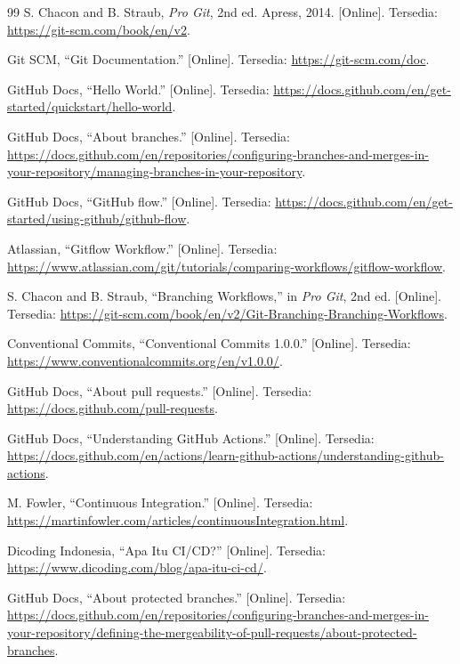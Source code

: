 \documentclass[a4paper,oneside,12pt]{report}
\renewcommand{\bibname}{Daftar Pustaka}
\begin{document}
\clearpage
{}
\renewcommand{\bibname}{Daftar Pustaka}
\begin{thebibliography}{99}
     S. Chacon and B. Straub, \textit{Pro Git}, 2nd ed. Apress, 2014. [Online]. Tersedia: \url{https://git-scm.com/book/en/v2}.

     Git SCM, ``Git Documentation.'' [Online]. Tersedia: \url{https://git-scm.com/doc}.

     GitHub Docs, ``Hello World.'' [Online]. Tersedia: \url{https://docs.github.com/en/get-started/quickstart/hello-world}.

     GitHub Docs, ``About branches.'' [Online]. Tersedia: \url{https://docs.github.com/en/repositories/configuring-branches-and-merges-in-your-repository/managing-branches-in-your-repository}.

     GitHub Docs, ``GitHub flow.'' [Online]. Tersedia: \url{https://docs.github.com/en/get-started/using-github/github-flow}.

     Atlassian, ``Gitflow Workflow.'' [Online]. Tersedia: \url{https://www.atlassian.com/git/tutorials/comparing-workflows/gitflow-workflow}.

     S. Chacon and B. Straub, ``Branching Workflows,'' in \textit{Pro Git}, 2nd ed. [Online]. Tersedia: \url{https://git-scm.com/book/en/v2/Git-Branching-Branching-Workflows}.

     Conventional Commits, ``Conventional Commits 1.0.0.'' [Online]. Tersedia: \url{https://www.conventionalcommits.org/en/v1.0.0/}.

     GitHub Docs, ``About pull requests.'' [Online]. Tersedia: \url{https://docs.github.com/pull-requests}.

     GitHub Docs, ``Understanding GitHub Actions.'' [Online]. Tersedia: \url{https://docs.github.com/en/actions/learn-github-actions/understanding-github-actions}.

     M. Fowler, ``Continuous Integration.'' [Online]. Tersedia: \url{https://martinfowler.com/articles/continuousIntegration.html}.

     Dicoding Indonesia, ``Apa Itu CI/CD?'' [Online]. Tersedia: \url{https://www.dicoding.com/blog/apa-itu-ci-cd/}.

     GitHub Docs, ``About protected branches.'' [Online]. Tersedia: \url{https://docs.github.com/en/repositories/configuring-branches-and-merges-in-your-repository/defining-the-mergeability-of-pull-requests/about-protected-branches}.


\end{thebibliography}
\end{document}
